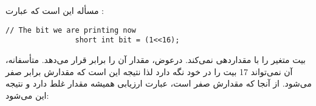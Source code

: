 \section{}
\paragraph{}\label{answer:2}
مسأله این است که عبارت :
\begin{LTR}
            \begin{lstlisting}[style=C++Style]
                // The bit we are printing now
                short int bit = (1<<16);
            \end{lstlisting}
\end{LTR}

بیت متغیر را با  مقداردهی نمی‌کند. درعوض، مقدار آن را برابر  قرار می‌دهد. متأسفانه، آن نمی‌تواند 17 بیت را در خود نگه دارد لذا نتیجه این است که مقدارش برابر صفر می‌شود. از آنجا که مقدارش صفر است، عبارت ارزیابی همیشه مقدار غلط دارد و نتیجه این می‌شود:
\lr{\texttt{---------------}}
